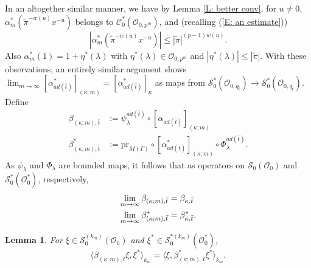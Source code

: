 \documentclass{article}
\newtheorem{lemma}[theorem]{Lemma}
\theoremstyle{remark}
\def\c #1{ {\mathcal #1} }
\begin{document}
In an altogether similar manner, we have by Lemma \ref{L: better conv}, for $u \not= 0$, $\alpha_m^*(\tilde \pi^{-w(u)} x^{-u})$ belongs to $\c C_0^*(\c O_{0, p^m})$, and (recalling (\ref{E: an estimate}))
\[
| \alpha_m^*(\tilde \pi^{-w(u)} x^{-u}) | \leq | \tilde \pi |^{(p-1) w(u)}.
\]
Also $\alpha_m^*(1) = 1 + \eta^*(\lambda)$ with $\eta^*(\lambda) \in \c O_{0, p^m}$ and $|\eta^*(\lambda)| \leq |\tilde \pi|$. With these observations, an entirely similar argument shows 
$\lim_{m \rightarrow \infty} [ \alpha_{a d(\bar t)}^* ]_{(\kappa; m)} = [\alpha_{a d(\bar t)}^*]_\kappa$ as maps from $\c S_0^*(\c O_{0, q_{\bar t}}) \rightarrow \c S_0^*(\c O_{0, q_{\bar t}}) $. Define
\begin{align*}
\beta_{(\kappa; m), \bar t} &:= \psi_\lambda^{a d(\bar t)} \circ [ \alpha_{a d(\bar t)}]_{(\kappa; m)} \\
\beta_{(\kappa; m), \bar t}^* &:=  \text{pr}_{M(\Gamma)} \circ [ \alpha_{a d(\bar t)}^*]_{(\kappa; m)} \circ \Phi_\lambda^{a d(\bar t)}.
\end{align*}
As $\psi_\lambda$ and $\Phi_\lambda$ are bounded maps, it follows that as operators on $\c S_0(\c O_0)$ and $\c S_0^*(\c O_0^*)$, respectively, 
\begin{align}\label{E: beta limit}
\lim_{m \rightarrow \infty} \beta_{(\kappa; m), \bar t} &= \beta_{\kappa, \bar t} \\
\lim_{m \rightarrow \infty} \beta_{(\kappa; m), \bar t}^* &= \beta_{\kappa, \bar t}^*. \notag
\end{align}




\begin{lemma}
For $\xi \in \c S_0^{(k_m)}(\c O_0)$ and $\xi^*  \in \c S_0^{*(k_m)}(\c O_0^*)$, 
\begin{equation}\label{E: pairing with estimate}
\langle \beta_{(\kappa; m), \bar t} \xi, \xi^* \rangle_{k_m} = \langle \xi, \beta_{(\kappa; m), \bar t}^* \xi^* \rangle_{k_m}.
\end{equation}
\end{lemma}
\end{document}
